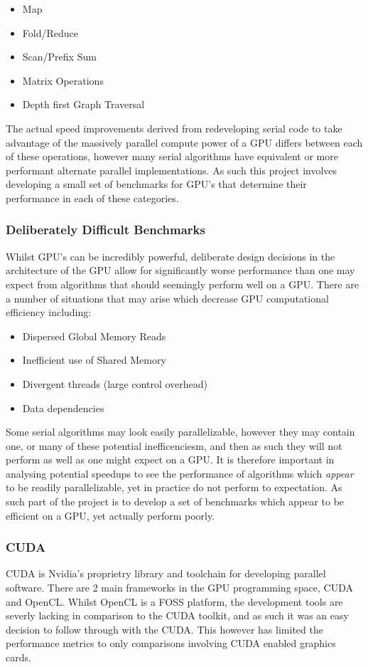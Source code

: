 \begin{itemize}
\item Map
\item Fold/Reduce
\item Scan/Prefix Sum
\item Matrix Operations
\item Depth first Graph Traversal
\end{itemize}

The actual speed improvements derived from redeveloping serial code to take advantage of the massively parallel compute power of a GPU differs between each of these operations, however many serial algorithms have equivalent or more performant alternate parallel implementations. As such this project involves developing a small set of benchmarks for GPU's that determine their performance in each of these categories.

\subsubsection{Deliberately Difficult Benchmarks}
Whilst GPU's can be incredibly powerful, deliberate design decisions in the architecture of the GPU allow for significantly worse performance than one may expect from algorithms that should seemingly perform well on a GPU. There are a number of situations that may arise which decrease GPU computational efficiency including:

\begin{itemize}
\item Dispersed Global Memory Reads
\item Inefficient use of Shared Memory
\item Divergent threads (large control overhead)
\item Data dependencies
\end{itemize}

Some serial algorithms may look easily parallelizable, however they may contain one, or many of these potential inefficenciesm, and then as such they will not perform as well as one might expect on a GPU. It is therefore important in analysing potential speedups to see the performance of algorithms which \emph{appear} to be readily parallelizable, yet in practice do not perform to expectation. As such part of the project is to develop a set of benchmarks which appear to be efficient on a GPU, yet actually perform poorly.

\subsubsection{CUDA}
CUDA is Nvidia's proprietry library and toolchain for developing parallel software. There are 2 main frameworks in the GPU programming space, CUDA and OpenCL. Whilst OpenCL is a FOSS platform, the development tools are severly lacking in comparison to the CUDA toolkit, and as such it was an easy decision to follow through with the CUDA. This however has limited the performance metrics to only comparisons involving CUDA enabled graphics cards.



